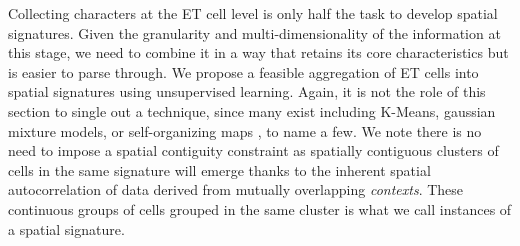 

Collecting characters at the ET cell level is only half the task to develop
spatial signatures. Given the granularity and multi-dimensionality of the
information at this stage, we need to combine it in a way that retains its
core characteristics but is easier to parse through.
%
We propose a feasible aggregation of ET cells into
spatial signatures using unsupervised learning. Again, it is not the role of
this section to single out a technique, since many exist including K-Means,
gaussian mixture models, or self-organizing maps \citep{kohonen1990self}, to
name a few. We note there is no need to impose a spatial contiguity constraint
as spatially contiguous clusters of cells in the same signature will emerge
thanks to the inherent spatial autocorrelation of data derived from mutually
overlapping \textit{contexts}.
%
These continuous groups of cells grouped in the same cluster is what we call
instances of a spatial signature.
